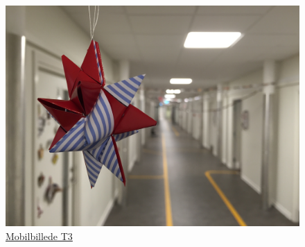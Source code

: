 \begin{figure}[!h]
\begin{minipage}[b]{0.3\linewidth}
\label{fig:T2}
\end{minipage}
\hspace{0.5cm}
\begin{minipage}[b]{0.3\linewidth}
\centering
\includegraphics[width=\textwidth]{Billeder/test_billeder/T3.jpg}
\caption{\href{https://www.dropbox.com/home/P1\%20-\%20B205/vejleder/billeder/Mobilbilleder/T3?preview=T3.jpg}{Mobilbillede T3}}
\label{fig:T3}
\end{minipage}
\end{figure}

